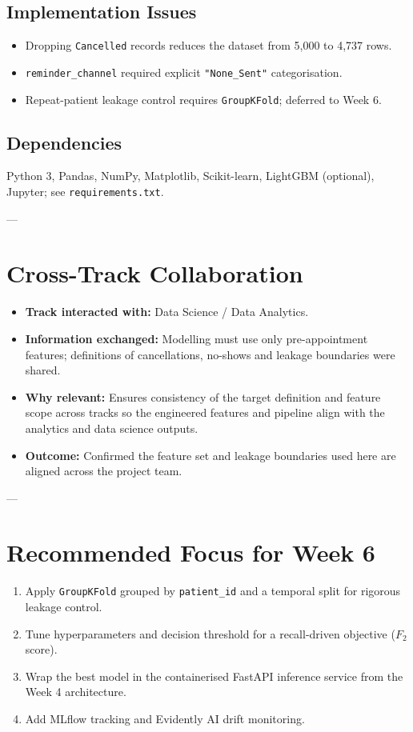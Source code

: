 \documentclass[11pt,a4paper]{article}
\begin{document}
\subsection{Implementation Issues}
\begin{itemize}
    \item Dropping \texttt{Cancelled} records reduces the dataset from 5,000 to 4,737 rows.
    \item \texttt{reminder\_channel} required explicit \texttt{"None\_Sent"} categorisation.
    \item Repeat-patient leakage control requires \texttt{GroupKFold}; deferred to Week 6.
\end{itemize}

\subsection{Dependencies}
Python 3, Pandas, NumPy, Matplotlib, Scikit-learn, LightGBM (optional), Jupyter; see
\texttt{requirements.txt}.

---

\section{Cross-Track Collaboration}
\begin{itemize}
    \item \textbf{Track interacted with:} Data Science / Data Analytics.
    \item \textbf{Information exchanged:} Modelling must use only pre-appointment features;
          definitions of cancellations, no-shows and leakage boundaries were shared.
    \item \textbf{Why relevant:} Ensures consistency of the target definition and feature scope
          across tracks so the engineered features and pipeline align with the analytics and data
          science outputs.
    \item \textbf{Outcome:} Confirmed the feature set and leakage boundaries used here are aligned
          across the project team.
\end{itemize}

---

\section{Recommended Focus for Week 6}
\begin{enumerate}
    \item Apply \texttt{GroupKFold} grouped by \texttt{patient\_id} and a temporal split for
          rigorous leakage control.
    \item Tune hyperparameters and decision threshold for a recall-driven objective ($F_2$ score).
    \item Wrap the best model in the containerised FastAPI inference service from the Week 4
          architecture.
    \item Add MLflow tracking and Evidently AI drift monitoring.
\end{enumerate}
\end{document}
